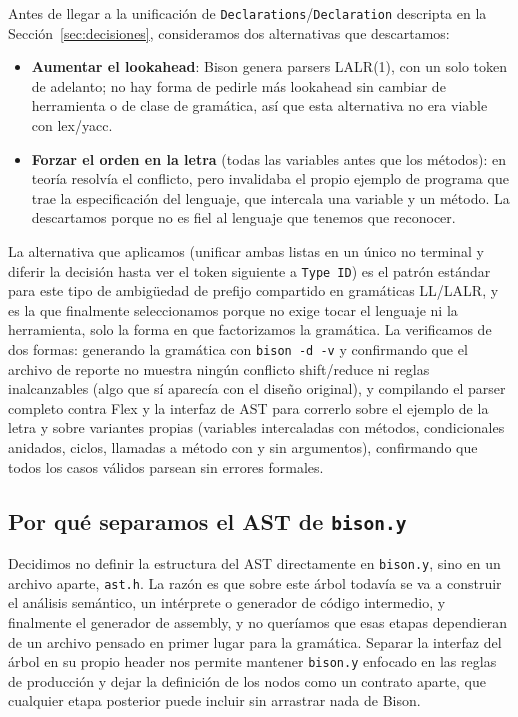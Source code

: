 \documentclass[11pt,a4paper]{article}
\begin{document}
Antes de llegar a la unificación de \texttt{Declarations}/\texttt{Declaration}
descripta en la Sección~\ref{sec:decisiones}, consideramos dos alternativas
que descartamos:

\begin{itemize}
  \item \textbf{Aumentar el lookahead}: Bison genera parsers LALR(1), con un
  solo token de adelanto; no hay forma de pedirle más lookahead sin cambiar
  de herramienta o de clase de gramática, así que esta alternativa no era
  viable con lex/yacc.
  \item \textbf{Forzar el orden en la letra} (todas las variables antes que
  los métodos): en teoría resolvía el conflicto, pero invalidaba el propio
  ejemplo de programa que trae la especificación del lenguaje, que intercala
  una variable y un método. La descartamos porque no es fiel al lenguaje que
  tenemos que reconocer.
\end{itemize}

La alternativa que aplicamos (unificar ambas listas en un único no terminal
y diferir la decisión hasta ver el token siguiente a \texttt{Type ID}) es el
patrón estándar para este tipo de ambigüedad de prefijo compartido en
gramáticas LL/LALR, y es la que finalmente seleccionamos porque no exige
tocar el lenguaje ni la herramienta, solo la forma en que factorizamos la
gramática. La verificamos de dos formas: generando la gramática con
\texttt{bison -d -v} y confirmando que el archivo de reporte no muestra
ningún conflicto shift/reduce ni reglas inalcanzables (algo que sí aparecía
con el diseño original), y compilando el parser completo contra Flex y la
interfaz de AST para correrlo sobre el ejemplo de la letra y sobre variantes
propias (variables intercaladas con métodos, condicionales anidados, ciclos,
llamadas a método con y sin argumentos), confirmando que todos los casos
válidos parsean sin errores formales.

\subsection{Por qué separamos el AST de \texttt{bison.y}}

Decidimos no definir la estructura del AST directamente en
\texttt{bison.y}, sino en un archivo aparte, \texttt{ast.h}. La razón es que
sobre este árbol todavía se va a construir el análisis semántico, un
intérprete o generador de código intermedio, y finalmente el generador de
assembly, y no queríamos que esas etapas dependieran de un archivo pensado en
primer lugar para la gramática. Separar la interfaz del árbol en su propio
header nos permite mantener \texttt{bison.y} enfocado en las reglas de
producción y dejar la definición de los nodos como un contrato aparte, que
cualquier etapa posterior puede incluir sin arrastrar nada de Bison.
\end{document}
